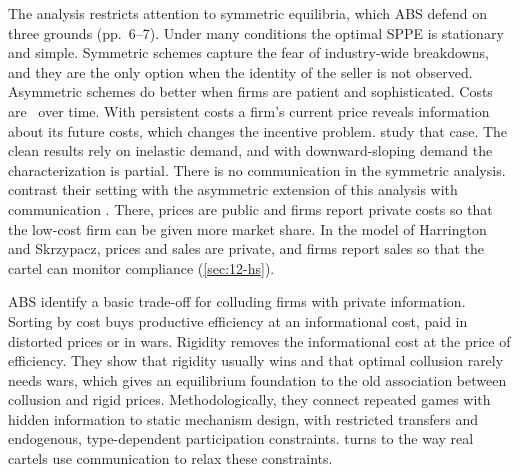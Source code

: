 The analysis restricts attention to symmetric equilibria, which ABS defend on three grounds (pp.~6--7). Under many
conditions the optimal SPPE is stationary and simple. Symmetric schemes capture the fear of industry-wide breakdowns,
and they are the only option when the identity of the seller is not observed. Asymmetric schemes do better when firms
are patient and sophisticated. Costs are \iid\ over time. With persistent costs a firm's current price reveals
information about its future costs, which changes the incentive problem. \citet{AtheyBagwell2008} study that case.
The clean results rely on inelastic demand, and with downward-sloping demand the characterization is partial. There
is no communication in the symmetric analysis. \citet[p.~2431]{HarringtonSkrzypacz2011} contrast their setting with
the asymmetric extension of this analysis with communication \citep{AtheyBagwell2001,AtheyBagwell2008}. There, prices
are public and firms report private costs so that the low-cost firm can be given more market share. In the model of
Harrington and Skrzypacz, prices and sales are private, and firms report sales so that the cartel can monitor
compliance (\cref{sec:12-hs}).

ABS identify a basic trade-off for colluding firms with private information. Sorting by cost buys productive
efficiency at an informational cost, paid in distorted prices or in wars. Rigidity removes the informational cost at
the price of efficiency. They show that rigidity usually wins and that optimal collusion rarely needs wars, which gives
an equilibrium foundation to the old association between collusion and rigid prices. Methodologically, they connect
repeated games with hidden information to static mechanism design, with restricted transfers and endogenous,
type-dependent participation constraints.  turns to the way real cartels use communication to
relax these constraints.
